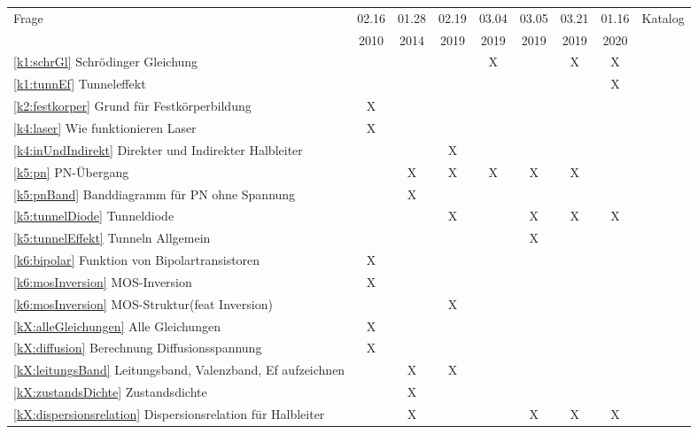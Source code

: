 \documentclass{article}
\begin{document}
\begin{table}[h]

\begin{adjustbox}{width=\textwidth}
\begin{tabular}{lcccccccc}
Frage                & 02.16 & 01.28 & 02.19 & 03.04 & 03.05 & 03.21 & 01.16 & Katalog\\
                     & 2010  & 2014  & 2019  & 2019  & 2019  & 2019  & 2020 & \\
                     \hline
\ref{k1:schrGl} Schrödinger Gleichung&&&& X &  & X & X &  \\
\ref{k1:tunnEf} Tunneleffekt&&&&&&&X & \\
\ref{k2:festkorper} Grund für Festkörperbildung & X &&&&&&& \\
\ref{k4:laser} Wie funktionieren Laser & X &&&&&&& \\
\ref{k4:inUndIndirekt} Direkter und Indirekter Halbleiter&&& X &&&&& \\
\ref{k5:pn} PN-\"Ubergang && X & X & X &X&X&& \\
\ref{k5:pnBand} Banddiagramm f\"ur PN ohne Spannung  && X &&&&&& \\
\ref{k5:tunnelDiode} Tunneldiode&&& X && X & X & X & \\
\ref{k5:tunnelEffekt} Tunneln Allgemein&&&&& X &&& \\
\ref{k6:bipolar} Funktion von Bipolartransistoren & X &&&&&&& \\
\ref{k6:mosInversion} MOS-Inversion & X &&&&&&& \\
\ref{k6:mosInversion} MOS-Struktur(feat Inversion)&&& X &&&&& \\
\ref{kX:alleGleichungen} Alle Gleichungen & X &&&&&&& \\
\ref{kX:diffusion} Berechnung Diffusionsspannung & X &&&&&&& \\
\ref{kX:leitungsBand} Leitungsband, Valenzband, Ef aufzeichnen && X & X &&&&& \\
\ref{kX:zustandsDichte} Zustandsdichte&& X &&&&& \\
\ref{kX:dispersionsrelation} Dispersionsrelation für Halbleiter && X &&& X & X & X & \\

\hline

\hline
\end{tabular}
\end{adjustbox}
\end{table}

\end{document}

